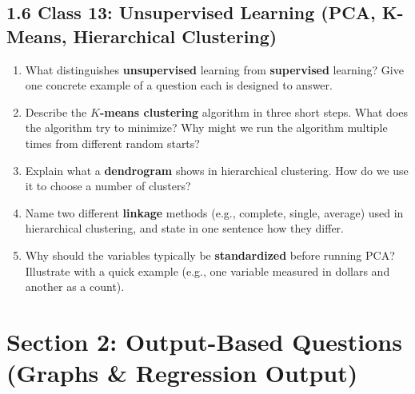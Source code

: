 \documentclass[11pt]{article}
\begin{document}
\subsection*{1.6 Class 13: Unsupervised Learning (PCA, K-Means, Hierarchical Clustering)}

\begin{enumerate}[leftmargin=*, resume]

\item What distinguishes \textbf{unsupervised} learning from \textbf{supervised} learning? Give one concrete example of a question each is designed to answer.

\item Describe the \textbf{$K$-means clustering} algorithm in three short steps. What does the algorithm try to minimize? Why might we run the algorithm multiple times from different random starts?

\item Explain what a \textbf{dendrogram} shows in hierarchical clustering. How do we use it to choose a number of clusters?

\item Name two different \textbf{linkage} methods (e.g., complete, single, average) used in hierarchical clustering, and state in one sentence how they differ.

\item Why should the variables typically be \textbf{standardized} before running PCA? Illustrate with a quick example (e.g., one variable measured in dollars and another as a count).

\end{enumerate}



\newpage
\section*{Section 2: Output-Based Questions (Graphs \& Regression Output)}

\bigskip
\end{document}
